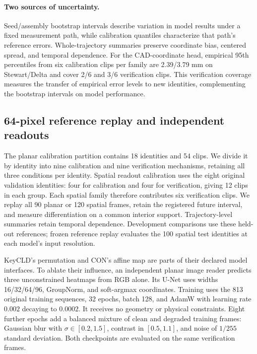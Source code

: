 \paragraph{Two sources of uncertainty.}
Seed/assembly bootstrap intervals describe variation in model results under a fixed measurement path, while calibration quantiles characterize that path's reference errors. Whole-trajectory summaries preserve coordinate bias, centered spread, and temporal dependence. For the CAD-coordinate head, empirical 95th percentiles from six calibration clips per family are 2.39/3.79 mm on Stewart/Delta and cover 2/6 and 3/6 verification clips. This verification coverage measures the transfer of empirical error levels to new identities, complementing the bootstrap intervals on model performance.

\subsection{64-pixel reference replay and independent readouts}
The planar calibration partition contains 18 identities and 54 clips. We divide it by identity into nine calibration and nine verification mechanisms, retaining all three conditions per identity. Spatial readout calibration uses the eight original validation identities: four for calibration and four for verification, giving 12 clips in each group. Each spatial family therefore contributes six verification clips. We replay all 90 planar or 120 spatial frames, retain the registered future interval, and measure differentiation on a common interior support. Trajectory-level summaries retain temporal dependence. Development comparisons use these held-out references; frozen reference replay evaluates the 100 spatial test identities at each model's input resolution.

KeyCLD's permutation and CON's affine map are parts of their declared model interfaces. To ablate their influence, an independent planar image reader predicts three unconstrained heatmaps from RGB alone. Its U-Net uses widths 16/32/64/96, GroupNorm, and soft-argmax coordinates. Training uses the 813 original training sequences, 32 epochs, batch 128, and AdamW with learning rate $0.002$ decaying to $0.0002$. It receives no geometry or physical constraints. Eight further epochs add a balanced mixture of clean and degraded training frames: Gaussian blur with $\sigma\in[0.2,1.5]$, contrast in $[0.5,1.1]$, and noise of $1/255$ standard deviation. Both checkpoints are evaluated on the same verification frames.

